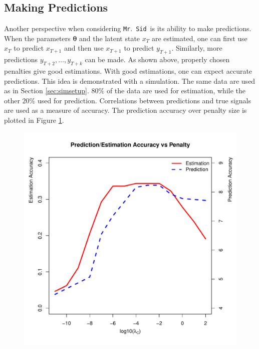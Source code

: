 \documentclass[fleqn,12pt]{article}
\let\oldref\ref
\renewcommand{\ref}[1]{(\oldref{#1})}
\newcommand{\mrsid}{{\sc \texttt{Mr}.~\texttt{Sid}}}
\begin{document}
\subsection{Making Predictions}
Another perspective when considering \mrsid~is its ability to make predictions. When the parameters $\mathbf{\theta}$ and the latent state $x_T$ are estimated, one can first use $x_T$ to predict $x_{T+1}$ and then use $x_{T+1}$ to predict $y_{T+1}$. Similarly, more predictions $y_{T+2},\ldots, y_{T+k}$ can be made. As shown above, properly chosen penalties give good estimations. With good estimations, one can expect accurate predictions. This idea is demonstrated with a simulation. The same data are used as in Section \oldref{sec:simsetup}. $80\%$ of the data are used for estimation, while the other $20\%$ used for prediction. Correlations between predictions and true signals are used as a measure of accuracy. The prediction accuracy over penalty size is plotted in Figure \oldref{fig:estpredaccuracy}.

\begin{figure}
\centering
\includegraphics[scale=0.46]{./figures/est-pred-accuracy.pdf}
\label{fig:estpredaccuracy}
\end{figure}
\end{document}
